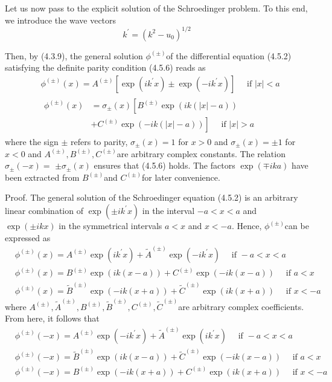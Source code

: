 \documentclass{article}
\begin{document}
Let us now pass to the explicit solution of the Schroedinger problem. To this end, we introduce the wave vectors
$$
\begin{equation*}
k^{\prime}=\left(k^{2}-u_{0}\right)^{1 / 2} \tag{4.5.7}
\end{equation*}
$$

Then, by (4.3.9), the general solution $\phi^{( \pm)}$of the differential equation (4.5.2)
satisfying the definite parity condition (4.5.6) reads as
$$
\begin{align*}
& \phi^{( \pm)}(x)=A^{( \pm)}\left[\exp \left(i k^{\prime} x\right) \pm \exp \left(-i k^{\prime} x\right)\right] \quad \text { if }|x|<a  \tag{4.5.8a}\\
& \begin{align*}
\phi^{( \pm)}(x) & =\sigma_{ \pm}(x)\left[B^{( \pm)} \exp (i k(|x|-a))\right. \\
& \left.+C^{( \pm)} \exp (-i k(|x|-a))\right] \quad \text { if }|x|>a
\end{align*} \tag{4.5.8~b}
\end{align*}
$$
where the sign $\pm$ refers to parity, $\sigma_{ \pm}(x)=1$ for $x>0$ and $\sigma_{ \pm}(x)= \pm 1$ for $x<0$ and $A^{( \pm)}, B^{( \pm)}, C^{( \pm)}$are arbitrary complex constants. The relation $\sigma_{ \pm}(-x)=$ $\pm \sigma_{ \pm}(x)$ ensures that (4.5.6) holds. The factors $\exp (\mp i k a)$ have been extracted from $B^{( \pm)}$and $C^{( \pm)}$for later convenience.

Proof. The general solution of the Schroedinger equation (4.5.2) is an arbitrary linear combination of $\exp \left( \pm i k^{\prime} x\right)$ in the interval $-a<x<a$ and $\exp ( \pm i k x)$ in the symmetrical intervals $a<x$ and $x<-a$. Hence, $\phi^{( \pm)}$can be expressed as
$$
\begin{align*}
& \phi^{( \pm)}(x)=A^{( \pm)} \exp \left(i k^{\prime} x\right)+\tilde{A}^{( \pm)} \exp \left(-i k^{\prime} x\right) \quad \text { if }-a<x<a  \tag{4.5.9a}\\
& \phi^{( \pm)}(x)=B^{( \pm)} \exp (i k(x-a))+C^{( \pm)} \exp (-i k(x-a)) \quad \text { if } a<x  \tag{4.5.9b}\\
& \phi^{( \pm)}(x)=\tilde{B}^{( \pm)} \exp (-i k(x+a))+\tilde{C}^{( \pm)} \exp (i k(x+a)) \quad \text { if } x<-a \tag{4.5.9c}
\end{align*}
$$
where $A^{( \pm)}, \tilde{A}^{( \pm)}, B^{( \pm)}, \tilde{B}^{( \pm)}, C^{( \pm)}, \tilde{C}^{( \pm)}$are arbitrary complex coefficients. From here, it follows that
$$
\begin{align*}
& \phi^{( \pm)}(-x)=A^{( \pm)} \exp \left(-i k^{\prime} x\right)+\tilde{A}^{( \pm)} \exp \left(i k^{\prime} x\right) \quad \text { if }-a<x<a  \tag{4.5.10a}\\
& \phi^{( \pm)}(-x)=\tilde{B}^{( \pm)} \exp (i k(x-a))+\tilde{C}^{( \pm)} \exp (-i k(x-a)) \quad \text { if } a<x  \tag{4.5.10b}\\
& \phi^{( \pm)}(-x)=B^{( \pm)} \exp (-i k(x+a))+C^{( \pm)} \exp (i k(x+a)) \quad \text { if } x<-a \tag{4.5.10c}
\end{align*}
$$
\end{document}
